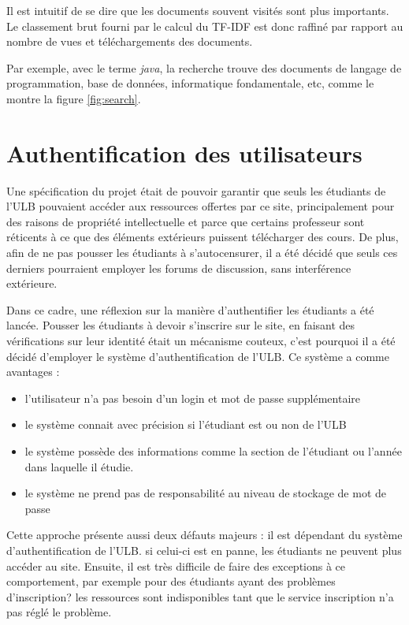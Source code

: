 \documentclass[a4paper,12pt]{article}
\begin{document}
Il est intuitif de se dire que les documents souvent visités sont
plus importants. Le classement brut fourni par le calcul du TF-IDF est donc raffiné
par rapport au nombre de vues et téléchargements des documents.

Par exemple, avec le terme \textit{java}, la recherche trouve des documents de langage
de programmation, base de données, informatique fondamentale, etc, comme le montre la figure
\ref{fig:search}.


\section{Authentification des utilisateurs}

Une spécification du projet était de pouvoir garantir que seuls les étudiants de l'ULB
pouvaient accéder aux ressources offertes par ce site, principalement pour des raisons
de propriété intellectuelle et parce que certains professeur sont réticents à 
ce que des éléments extérieurs puissent télécharger des cours. De plus, afin
de ne pas pousser les étudiants à s'autocensurer, il a été décidé que seuls ces derniers
pourraient employer les forums de discussion, sans interférence extérieure.

Dans ce cadre, une réflexion sur la manière d'authentifier les étudiants
a été lancée. Pousser les étudiants à devoir s'inscrire sur le site, en faisant des
vérifications sur leur identité était un mécanisme couteux, c'est pourquoi il a été décidé
d'employer le système d'authentification de l'ULB. Ce système a comme avantages :
\begin{itemize}
\item l'utilisateur n'a pas besoin d'un login et mot de passe supplémentaire
\item le système connait avec précision si l'étudiant est ou non de l'ULB
\item le système possède des informations comme la section de l'étudiant ou
      l'année dans laquelle il étudie.
\item le système ne prend pas de responsabilité au niveau de stockage de mot de passe
\end{itemize}

Cette approche présente aussi deux défauts majeurs : il est dépendant du système
d'authentification de l'ULB. si celui-ci est en panne, les étudiants ne peuvent plus
accéder au site. Ensuite, il est très difficile de faire des exceptions à ce comportement,
par exemple pour des étudiants ayant des problèmes d'inscription? les ressources
sont indisponibles tant que le service inscription n'a pas réglé le problème.
\end{document}
